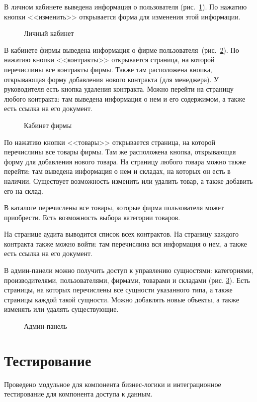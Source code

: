 В личном кабинете выведена информация о пользователя (рис.~\ref{work_lk}).
По нажатию кнопки <<изменить>> открывается форма для изменения этой информации.
\begin{figure}[!h]
	\caption{Личный кабинет}
	\label{work_lk}
\end{figure}

В кабинете фирмы выведена информация о фирме пользователя~(рис.~\ref{work_frm}).
По нажатию кнопки <<контракты>> открывается страница, на которой перечислины все контракты фирмы.
Также там расположена кнопка, открывающая форму добавления нового контракта (для менеджера).
У руководителя есть кнопка удаления контракта.
Можно перейти на страницу любого контракта: там выведена информация о нем и его содержимом, а также есть ссылка на его документ.
\begin{figure}[!h]
	\caption{Кабинет фирмы}
	\label{work_frm}
\end{figure}

По нажатию кнопки <<товары>> открывается страница, на которой перечислины все товары фирмы.
Там же расположена кнопка, открывающая форму для добавления нового товара.
На страницу любого товара можно также перейти: там выведена информация о нем и складах, на которых он есть в наличии.
Существует возможность изменить или удалить товар, а также добавить его на склад.

В каталоге перечислены все товары, которые фирма пользователя может приобрести.
Есть возможность выбора категории товаров.

На странице аудита выводится список всех контрактов.
На страницу каждого контракта также можно войти: там перечислина вся информация о нем, а также есть ссылка на его документ.

В админ-панели можно получить доступ к управлению сущностями: категориями, производителями, пользователями, фирмами, товарами и складами (рис. \ref{work_ap}).
Есть страницы, на которых перечислены все сущности указанного типа, а также страницы каждой такой сущности.
Можно добавлять новые объекты, а также изменять или удалять существующие.
\begin{figure}[!h]
	\caption{Админ-панель}
	\label{work_ap}
\end{figure}

\section{Тестирование}
Проведено модульное для компонента бизнес-логики и интеграционное тестирование для компонента доступа к данным.

